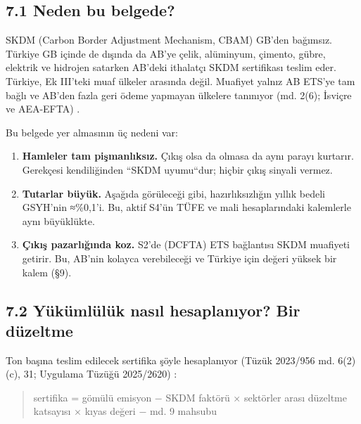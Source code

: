 \hypertarget{02c_hazirlik-71-neden-bu-belgede}{%
\subsection{7.1 Neden bu belgede?}\label{02c_hazirlik-71-neden-bu-belgede}}

SKDM (Carbon Border Adjustment Mechanism, CBAM) GB'den bağımsız. Türkiye GB içinde de dışında da AB'ye çelik, alüminyum, çimento, gübre, elektrik ve hidrojen satarken AB'deki ithalatçı SKDM sertifikası teslim eder. Türkiye, Ek III'teki muaf ülkeler arasında değil. Muafiyet yalnız AB ETS'ye tam bağlı ve AB'den fazla geri ödeme yapmayan ülkelere tanınıyor (md. 2(6); İsviçre ve AEA-EFTA) \etiketV{}.

Bu belgede yer almasının üç nedeni var:

\begin{enumerate}
\def\labelenumi{\arabic{enumi}.}
\tightlist
\item
  \textbf{Hamleler tam pişmanlıksız.} Çıkış olsa da olmasa da aynı parayı kurtarır. Gerekçesi kendiliğinden ``SKDM uyumu``dur; hiçbir çıkış sinyali vermez.
\item
  \textbf{Tutarlar büyük.} Aşağıda görüleceği gibi, hazırlıksızlığın yıllık bedeli GSYH'nin ≈\%0,1'i. Bu, aktif S4'ün TÜFE ve mali hesaplarındaki kalemlerle aynı büyüklükte.
\item
  \textbf{Çıkış pazarlığında koz.} S2'de (DCFTA) ETS bağlantısı SKDM muafiyeti getirir. Bu, AB'nin kolayca verebileceği ve Türkiye için değeri yüksek bir kalem (§9).
\end{enumerate}

\hypertarget{02c_hazirlik-72-yuxfckuxfcmluxfcluxfck-nasux131l-hesaplanux131yor-bir-duxfczeltme}{%
\subsection{7.2 Yükümlülük nasıl hesaplanıyor? Bir düzeltme}\label{02c_hazirlik-72-yuxfckuxfcmluxfcluxfck-nasux131l-hesaplanux131yor-bir-duxfczeltme}}

Ton başına teslim edilecek sertifika şöyle hesaplanıyor (Tüzük 2023/956 md. 6(2)(c), 31; Uygulama Tüzüğü 2025/2620) \etiketV{}:

\begin{quote}
sertifika = gömülü emisyon − SKDM faktörü × sektörler arası düzeltme katsayısı × kıyas değeri − md. 9 mahsubu
\end{quote}

